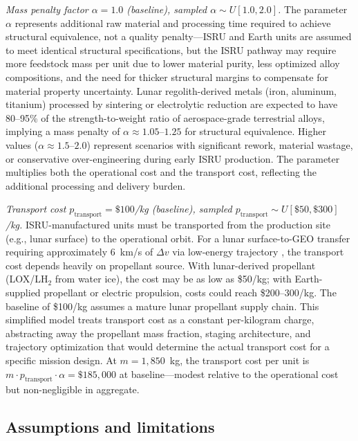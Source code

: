 \documentclass[preprint,12pt]{elsarticle}
\begin{document}
\emph{Mass penalty factor $\alpha = 1.0$ (baseline), sampled $\alpha \sim U[1.0, 2.0]$.} The parameter $\alpha$ represents additional raw material and processing time required to achieve structural equivalence, not a quality penalty---ISRU and Earth units are assumed to meet identical structural specifications, but the ISRU pathway may require more feedstock mass per unit due to lower material purity, less optimized alloy compositions, and the need for thicker structural margins to compensate for material property uncertainty. Lunar regolith-derived metals (iron, aluminum, titanium) processed by sintering or electrolytic reduction are expected to have 80--95\% of the strength-to-weight ratio of aerospace-grade terrestrial alloys, implying a mass penalty of $\alpha \approx 1.05$--$1.25$ for structural equivalence. Higher values ($\alpha \approx 1.5$--$2.0$) represent scenarios with significant rework, material wastage, or conservative over-engineering during early ISRU production. The parameter multiplies both the operational cost and the transport cost, reflecting the additional processing and delivery burden.

\emph{Transport cost $p_{\mathrm{transport}} = \$100$/kg (baseline), sampled $p_{\mathrm{transport}} \sim U[\$50, \$300]$/kg.} ISRU-manufactured units must be transported from the production site (e.g., lunar surface) to the operational orbit. For a lunar surface-to-GEO transfer requiring approximately 6~km/s of $\Delta v$ via low-energy trajectory \cite{ishimatsu2016}, the transport cost depends heavily on propellant source. With lunar-derived propellant (LOX/LH$_2$ from water ice), the cost may be as low as \$50/kg; with Earth-supplied propellant or electric propulsion, costs could reach \$200--300/kg. The baseline of \$100/kg assumes a mature lunar propellant supply chain. This simplified model treats transport cost as a constant per-kilogram charge, abstracting away the propellant mass fraction, staging architecture, and trajectory optimization that would determine the actual transport cost for a specific mission design. At $m = 1{,}850$~kg, the transport cost per unit is $m \cdot p_{\mathrm{transport}} \cdot \alpha = \$185{,}000$ at baseline---modest relative to the operational cost but non-negligible in aggregate.

\subsection{Assumptions and limitations}
\end{document}
